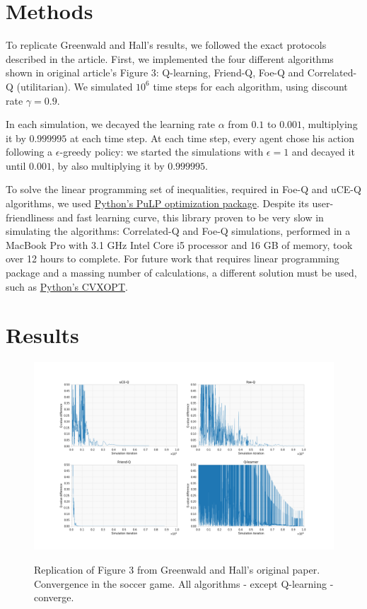 \documentclass{article}
\begin{document}
    \section{Methods}
    \label{sec:methods}
    To replicate Greenwald and Hall's results, we followed the exact protocols described in the article.
    First, we implemented the four different algorithms shown in original article's Figure 3: Q-learning, Friend-Q, Foe-Q and Correlated-Q (utilitarian).
    We simulated $10^{6}$ time steps for each algorithm, using discount rate $\gamma = 0.9$.

    In each simulation, we decayed the learning rate $\alpha$ from $0.1$ to $0.001$, multiplying it by $0.999995$ at each time step.
    At each time step, every agent chose his action following a $\epsilon$-greedy policy: we started the simulations with $\epsilon = 1$ and decayed it until $0.001$, by also multiplying it by $0.999995$.

    To solve the linear programming set of inequalities, required in Foe-Q and uCE-Q algorithms, we used \href{https://pythonhosted.org/PuLP/}{Python's PuLP optimization package}.
    Despite its user-friendliness and fast learning curve, this library proven to be very slow in simulating the algorithms: Correlated-Q and Foe-Q simulations, performed in a MacBook Pro with 3.1 GHz Intel Core i5 processor and 16 GB of memory, took over 12 hours to complete.
    For future work that requires linear programming package and a massing number of calculations, a different solution must be used, such as \href{https://cvxopt.org/}{Python's CVXOPT}.

    \section{Results}
    \label{sec:results}

    \begin{figure}[t]
        \includegraphics[width=\textwidth]{./images/figure2.png}
        \centering
        \label{fig2}
        \caption{Replication of Figure 3 from Greenwald and Hall's original paper.
        Convergence in the soccer game.
        All algorithms - except Q-learning - converge.}
    \end{figure}
\end{document}
